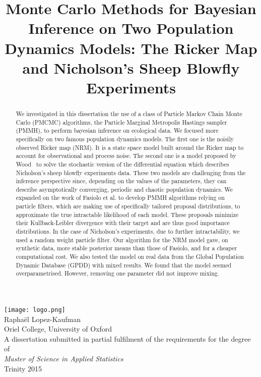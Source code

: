 \documentclass[12pt]{article}
\title{Monte Carlo Methods for Bayesian Inference on Two Population
	Dynamics Models: The Ricker Map and Nicholson's Sheep Blowfly Experiments}
\date{}
\begin{document}
	\maketitle 
	\thispagestyle{empty}
	\begin{center}
		\vspace{-5mm}
		\texttt{[image: logo.png]} \\
		\vspace{20mm}
		{\large Raphaël Lopez-Kaufman} \\
		\vspace{2mm}
		{\large Oriel College, University of Oxford} \\
		\vspace{50mm}
		A dissertation submitted in partial fulfilment of the requirements for the degree of \\
		\vspace{1mm}
		\textit{Master of Science in Applied Statistics} \\
		\vspace{1mm}
		Trinity 2015
	\end{center}
	
	\vspace{25 mm}
	
	\clearpage
	\begin{abstract}
		We investigated in this dissertation the use of a class of Particle Markov Chain Monte Carlo (PMCMC) algorithms, the Particle Marginal Metropolis Hastings sampler (PMMH), to perform bayesian inference on ecological data. We focused more specifically on two famous population dynamics models. The first one is the noisily observed Ricker map (NRM). It is a state space model built around the Ricker map to account for observational and process noise. The second one is a model proposed by Wood~\cite{wood2010statistical} to solve the stochastic version of the differential equation which describes Nicholson's sheep blowfly experiments data. These two models are challenging from the inference perspective since, depending on the values of the parameters, they can describe asymptotically converging, periodic and chaotic population dynamics. We expanded on the work of Fasiolo et al.\cite{fasiolo2014statistical} to develop PMMH algorithms relying on particle filters, which are making use of specifically tailored proposal distributions, to approximate the true intractable likelihood of each model. These proposals minimize their Kullback-Leibler divergence with their target and are thus good importance distributions. In the case of Nicholson's experiments, due to further intractability, we used a random weight particle filter. Our algorithm for the NRM model gave, on synthetic data, more stable  posterior means than those of Fasiolo, and for a cheaper computational cost. We also tested the model on real data from the Global Population Dynamic Database (GPDD) with mixed results. We found that the model seemed overparametrised. However, removing one parameter did not improve mixing.
	\end{abstract}
	
\end{document}
